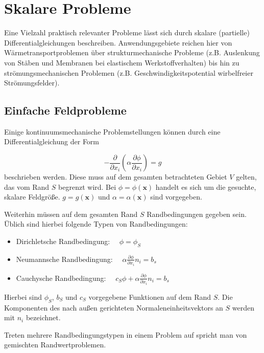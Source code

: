 \section{Skalare Probleme}

Eine Vielzahl praktisch relevanter Probleme lässt sich durch skalare (partielle)
Differentialgleichungen beschreiben. Anwendungsgebiete reichen hier von Wärmetransportproblemen
über strukturmechanische Probleme (z.B. Auslenkung von Stäben und Membranen bei elastischem
Werkstoffverhalten) bis hin zu strömungsmechanischen Problemen (z.B. Geschwindigkeitspotential
wirbelfreier Strömungsfelder).

\subsection{Einfache Feldprobleme}

Einige kontinuumsmechanische Problemstellungen können durch eine Differentialgleichung
der Form

\begin{equation}
  -\frac{\partial}{\partial x_i}\left({\alpha \frac{\partial \phi}{\partial x_i} }\right)=g
  \label{eq:feldproblem_stat}
\end{equation}
 beschrieben werden. Diese muss auf dem gesamten betrachteten Gebiet $V$ gelten, das
vom Rand $S$ begrenzt wird. Bei $\phi=\phi(\mathbf{x})$ handelt es sich um die gesuchte,
skalare Feldgröße. $g=g(\mathbf{x})$ und $\alpha=\alpha(\mathbf{x})$ sind vorgegeben.


Weiterhin müssen auf dem gesamten Rand $S$ Randbedingungen
gegeben sein. Üblich sind hierbei folgende Typen von Randbedingungen:

\begin{itemize}
  \item Dirichletsche Randbedingung: $\quad \phi=\phi_S$
  \item Neumannsche Randbedingung: $\quad \alpha \frac{\partial \phi}{\partial x_i} n_i = b_s $
  \item Cauchysche Randbedingung: $\quad c_S \phi + \alpha \frac{\partial \phi}{\partial x_i} n_i = b_s$
\end{itemize}

Hierbei sind $\phi_S$, $b_S$ und $c_S$ vorgegebene Funktionen auf dem Rand $S$. Die
Komponenten des nach außen gerichteten Normaleneinheitsvektors an $S$ werden mit $n_i$ bezeichnet.

Treten mehrere Randbedingungstypen in einem Problem auf spricht man von gemischten Randwertproblemen.

